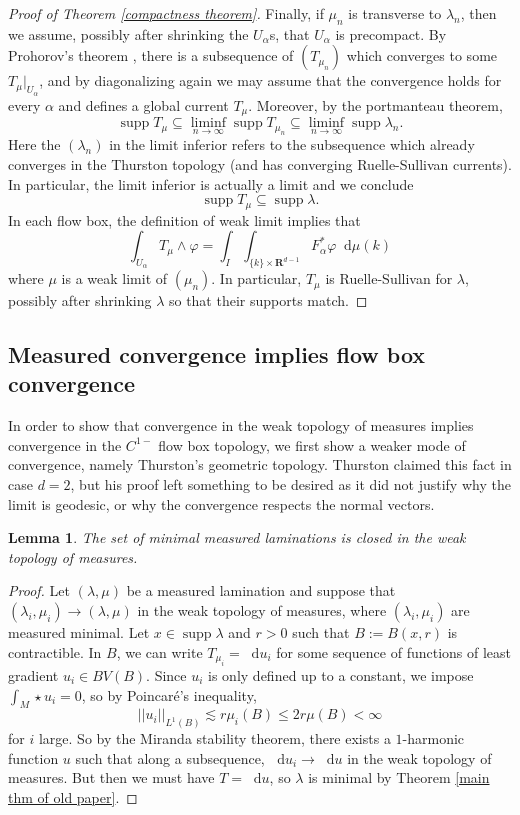 \documentclass[reqno,11pt]{amsart}
\newcommand{\RR}{\mathbf{R}}
\newcommand*\dif{\mathop{}\!\mathrm{d}}
\DeclareMathOperator{\supp}{supp}
\newtheorem{lemma}[theorem]{Lemma}
\theoremstyle{definition}
\numberwithin{equation}{section}
\begin{document}
\begin{proof}[Proof of Theorem \ref{compactness theorem}]
Finally, if $\mu_n$ is transverse to $\lambda_n$, then we assume, possibly after shrinking the $U_\alpha$s, that $U_\alpha$ is precompact.
By Prohorov's theorem \cite[Theorem 13.29]{klenke2013probability}, there is a subsequence of $(T_{\mu_n})$ which converges to some $T_\mu|_{U_\alpha}$, and by diagonalizing again we may assume that the convergence holds for every $\alpha$ and defines a global current $T_\mu$.
Moreover, by the portmanteau theorem,
$$\supp T_\mu \subseteq \liminf_{n \to \infty} \supp T_{\mu_n} \subseteq \liminf_{n \to \infty} \supp \lambda_n.$$
Here the $(\lambda_n)$ in the limit inferior refers to the subsequence which already converges in the Thurston topology (and has converging Ruelle-Sullivan currents).
In particular, the limit inferior is actually a limit and we conclude
$$\supp T_\mu \subseteq \supp \lambda.$$
In each flow box, the definition of weak limit implies that
$$\int_{U_\alpha} T_\mu \wedge \varphi = \int_I \int_{\{k\} \times \RR^{d - 1}} F_\alpha^* \varphi \dif \mu(k)$$
where $\mu$ is a weak limit of $(\mu_n)$.
In particular, $T_\mu$ is Ruelle-Sullivan for $\lambda$, possibly after shrinking $\lambda$ so that their supports match.
\end{proof}

\subsection{Measured convergence implies flow box convergence}
In order to show that convergence in the weak topology of measures implies convergence in the $C^{1-}$ flow box topology, we first show a weaker mode of convergence, namely Thurston's geometric topology.
Thurston claimed this fact \cite[Proposition 8.10.3]{thurston1979geometry} in case $d = 2$, but his proof left something to be desired as it did not justify why the limit is geodesic, or why the convergence respects the normal vectors.

\begin{lemma}\label{limits of measured geodesic lams are geodesic}
	The set of minimal measured laminations is closed in the weak topology of measures.
\end{lemma}
\begin{proof}
Let $(\lambda, \mu)$ be a measured lamination and suppose that $(\lambda_i, \mu_i) \to (\lambda, \mu)$ in the weak topology of measures, where $(\lambda_i, \mu_i)$ are measured minimal.
Let $x \in \supp \lambda$ and $r > 0$ such that $B := B(x, r)$ is contractible.
In $B$, we can write $T_{\mu_i} = \dif u_i$ for some sequence of functions of least gradient $u_i \in BV(B)$.
Since $u_i$ is only defined up to a constant, we impose $\int_M \star u_i = 0$, so by Poincar\'e's inequality,
$$||u_i||_{L^1(B)} \lesssim r\mu_i(B) \leq 2r \mu(B) < \infty$$
for $i$ large.
So by the Miranda stability theorem, there exists a $1$-harmonic function $u$ such that along a subsequence, $\dif u_i \to \dif u$ in the weak topology of measures.
But then we must have $T = \dif u$, so $\lambda$ is minimal by Theorem \ref{main thm of old paper}.
\end{proof}
\end{document}
